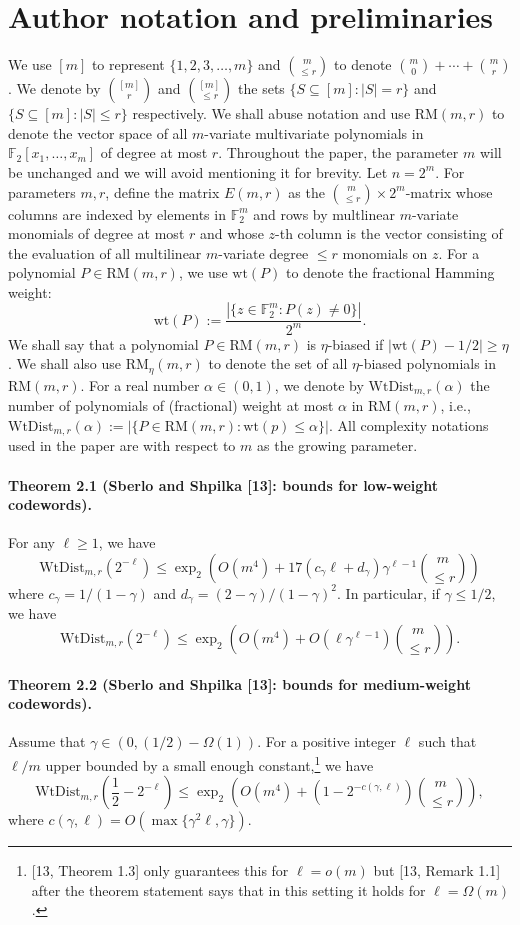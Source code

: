 \documentclass[10pt,a4paper]{article}
\begin{document}
\section*{Author notation and preliminaries}
We use $[m]$ to represent $\{1,2,3,\ldots,m\}$ and $\binom m{\le r}$ to denote $\binom m0+\cdots+\binom mr$. We denote by $\binom{[m]}r$ and $\binom{[m]}{\le r}$ the sets $\{S\subseteq[m]:|S|=r\}$ and $\{S\subseteq[m]:|S|\le r\}$ respectively.
We shall abuse notation and use $\mathrm{RM}(m,r)$ to denote the vector space of all $m$-variate multivariate polynomials in $\mathbb F_2[x_1,\ldots,x_m]$ of degree at most $r$. Throughout the paper, the parameter $m$ will be unchanged and we will avoid mentioning it for brevity. Let $n=2^m$.
For parameters $m,r$, define the matrix $E(m,r)$ as the $\binom m{\le r}\times2^m$-matrix whose columns are indexed by elements in $\mathbb F_2^m$ and rows by multlinear $m$-variate monomials of degree at most $r$ and whose $z$-th column is the vector consisting of the evaluation of all multilinear $m$-variate degree $\le r$ monomials on $z$.
For a polynomial $P\in\mathrm{RM}(m,r)$, we use $\mathrm{wt}(P)$ to denote the fractional Hamming weight:
\[\mathrm{wt}(P):=\frac{|\{z\in\mathbb F_2^m:P(z)\ne0\}|}{2^m}.\]
We shall say that a polynomial $P\in\mathrm{RM}(m,r)$ is $\eta$-biased if $|\mathrm{wt}(P)-1/2|\ge\eta$. We shall also use $\mathrm{RM}_\eta(m,r)$ to denote the set of all $\eta$-biased polynomials in $\mathrm{RM}(m,r)$. For a real number $\alpha\in(0,1)$, we denote by $\mathrm{WtDist}_{m,r}(\alpha)$ the number of polynomials of (fractional) weight at most $\alpha$ in $\mathrm{RM}(m,r)$, i.e., $\mathrm{WtDist}_{m,r}(\alpha):=|\{P\in\mathrm{RM}(m,r):\mathrm{wt}(p)\le\alpha\}|$. All complexity notations used in the paper are with respect to $m$ as the growing parameter.
\paragraph{Theorem 2.1 (Sberlo and Shpilka [13]: bounds for low-weight codewords).} For any $\ell\ge1$, we have
\[\mathrm{WtDist}_{m,r}(2^{-\ell})\le\operatorname{exp}_2\left(O(m^4)+17(c_\gamma\ell+d_\gamma)\gamma^{\ell-1}\binom m{\le r}\right)\]
where $c_\gamma=1/(1-\gamma)$ and $d_\gamma=(2-\gamma)/(1-\gamma)^2$. In particular, if $\gamma\le1/2$, we have
\[\mathrm{WtDist}_{m,r}(2^{-\ell})\le\operatorname{exp}_2\left(O(m^4)+O(\ell\gamma^{\ell-1})\binom m{\le r}\right).\tag{1}\]
\paragraph{Theorem 2.2 (Sberlo and Shpilka [13]: bounds for medium-weight codewords).} Assume that $\gamma\in(0,(1/2)-\Omega(1))$. For a positive integer $\ell$ such that $\ell/m$ upper bounded by a small enough constant,\footnote{[13, Theorem 1.3] only guarantees this for $\ell=o(m)$ but [13, Remark 1.1] after the theorem statement says that in this setting it holds for $\ell=\Omega(m)$.} we have
\[\mathrm{WtDist}_{m,r}\left(\frac12-2^{-\ell}\right)\le\operatorname{exp}_2\left(O(m^4)+(1-2^{-c(\gamma,\ell)})\binom m{\le r}\right),\tag{2}\]
where $c(\gamma,\ell)=O(\max\{\gamma^2\ell,\gamma\})$.
\end{document}
